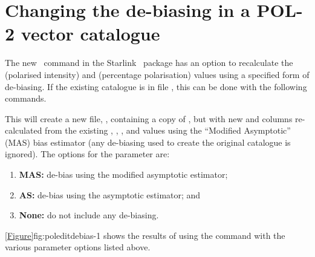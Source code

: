 \section{Changing the de-biasing in a POL-2 vector catalogue}

The new \poledit\ command in the Starlink \POLPACK\ package has an option
to recalculate the  (polarised intensity) and  (percentage polarisation)
values using a specified form of de-biasing. If the existing catalogue is in
file , this can be done with the following commands.

\begin{terminalv}
\end{terminalv}

This will create a new file, , containing a copy of
, but with new  and  columns re-calculated from the
existing , , , and  values using the ``Modified Asymptotic'' (MAS) bias
estimator (any de-biasing used to create the original catalogue is ignored).
The options for the  parameter are:

\begin{enumerate}
\item {\bf MAS:} de-bias using the modified asymptotic estimator;
\item {\bf AS:} de-bias using the asymptotic estimator; and
\item {\bf None:} do not include any de-biasing.
\end{enumerate}

\cref{Figure}{fig:poleditdebias-1}{} shows the results of using the
 command with the various  parameter options
listed above.

